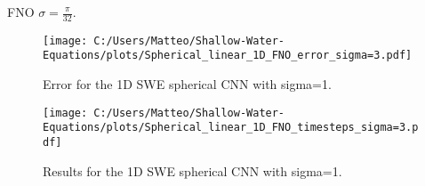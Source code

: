 FNO $\sigma = \frac{\pi}{32}$.
\begin{figure}[H]
    \centering
    \texttt{[image: C:/Users/Matteo/Shallow-Water-Equations/plots/Spherical\_linear\_1D\_FNO\_error\_sigma=3.pdf]}
    \caption{Error for the 1D SWE spherical CNN with sigma=1.}
\end{figure}

\begin{figure}[H]
    \centering
    \texttt{[image: C:/Users/Matteo/Shallow-Water-Equations/plots/Spherical\_linear\_1D\_FNO\_timesteps\_sigma=3.pdf]}
    \caption{Results for the 1D SWE spherical CNN with sigma=1.}
\end{figure}


